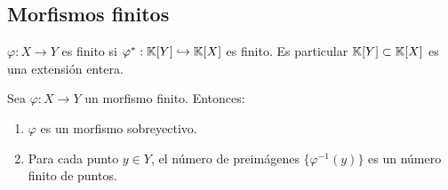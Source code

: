 \subsection{Morfismos finitos}

$\varphi: X \rightarrow Y$ es finito si $\varphi^*: \mathbb{K}[Y] \hookrightarrow \mathbb{K}[X]$ es finito. Es particular $\mathbb{K}[Y] \subset \mathbb{K}[X]$ es una extensión entera.

\begin{theorem} \label{thm:MorfismoFinito}
	Sea $\varphi: X \rightarrow Y$ un morfismo finito. Entonces:
	\begin{enumerate}
		\item $\varphi$ es un morfismo sobreyectivo.
		\item Para cada punto $y \in Y$, el número de preimágenes $\{ \varphi^{-1}(y) \}$ es un número finito de puntos.
	\end{enumerate}
\end{theorem}

